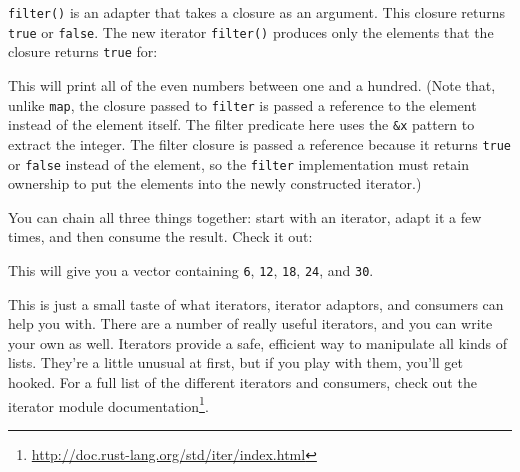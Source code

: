 \documentclass[a4paper,]{book}
\newenvironment{Shaded}{\begin{snugshade}}{\end{snugshade}}
\newcommand{\KeywordTok}[1]{\textcolor[rgb]{0.13,0.29,0.53}{\textbf{{#1}}}}
\newcommand{\DecValTok}[1]{\textcolor[rgb]{0.00,0.00,0.81}{{#1}}}
\newcommand{\StringTok}[1]{\textcolor[rgb]{0.31,0.60,0.02}{{#1}}}
\newcommand{\OtherTok}[1]{\textcolor[rgb]{0.56,0.35,0.01}{{#1}}}
\newcommand{\NormalTok}[1]{{#1}}
\renewcommand{\href}[2]{#2\footnote{\url{#1}}}
\begin{document}
\texttt{filter()} is an adapter that takes a closure as an argument.
This closure returns \texttt{true} or \texttt{false}. The new iterator
\texttt{filter()} produces only the elements that the closure returns
\texttt{true} for:

\begin{Shaded}
\end{Shaded}

This will print all of the even numbers between one and a hundred. (Note
that, unlike \texttt{map}, the closure passed to \texttt{filter} is
passed a reference to the element instead of the element itself. The
filter predicate here uses the \texttt{\&x} pattern to extract the
integer. The filter closure is passed a reference because it returns
\texttt{true} or \texttt{false} instead of the element, so the
\texttt{filter} implementation must retain ownership to put the elements
into the newly constructed iterator.)

You can chain all three things together: start with an iterator, adapt
it a few times, and then consume the result. Check it out:

\begin{Shaded}
\end{Shaded}

This will give you a vector containing \texttt{6}, \texttt{12},
\texttt{18}, \texttt{24}, and \texttt{30}.

This is just a small taste of what iterators, iterator adaptors, and
consumers can help you with. There are a number of really useful
iterators, and you can write your own as well. Iterators provide a safe,
efficient way to manipulate all kinds of lists. They're a little unusual
at first, but if you play with them, you'll get hooked. For a full list
of the different iterators and consumers, check out the
\href{http://doc.rust-lang.org/std/iter/index.html}{iterator module
documentation}.
\end{document}
